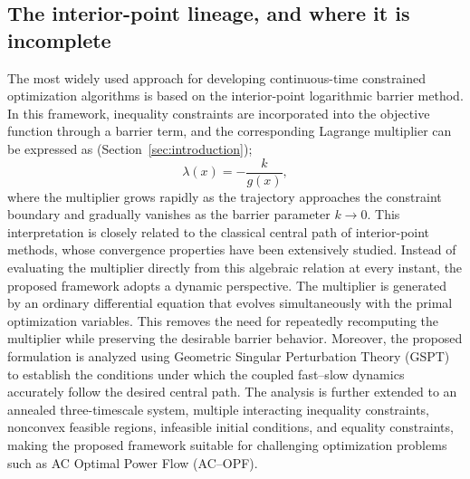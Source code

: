 \documentclass[11pt,onecolumn]{article}
\theoremstyle{definition}
\theoremstyle{remark}
\begin{document}
\subsection{The interior-point lineage, and where it is incomplete}
The most widely used approach for developing continuous-time constrained optimization algorithms is based on the interior-point logarithmic
barrier method. In this framework, inequality constraints are incorporated into the objective function through a barrier term, and the corresponding
Lagrange multiplier can be expressed as (Section~\ref{sec:introduction});
\[
\lambda(x)=-\frac{k}{g(x)},
\]
where the multiplier grows rapidly as the trajectory approaches the constraint boundary and gradually vanishes as the barrier parameter $k\rightarrow0$. This interpretation is closely related to the classical central path of interior-point methods, whose convergence properties have been extensively studied. Instead of evaluating the multiplier directly from this algebraic relation
at every instant, the proposed framework adopts a dynamic perspective. The multiplier is generated by an ordinary differential equation that evolves
simultaneously with the primal optimization variables. This removes the need
for repeatedly recomputing the multiplier while preserving the desirable
barrier behavior. Moreover, the proposed formulation is analyzed using
Geometric Singular Perturbation Theory (GSPT) to establish the
conditions under which the coupled fast--slow dynamics accurately follow the
desired central path. The analysis is further extended to an annealed
three-timescale system, multiple interacting inequality constraints,
nonconvex feasible regions, infeasible initial conditions, and equality
constraints, making the proposed framework suitable for challenging
optimization problems such as AC Optimal Power Flow (AC--OPF).
\end{document}
